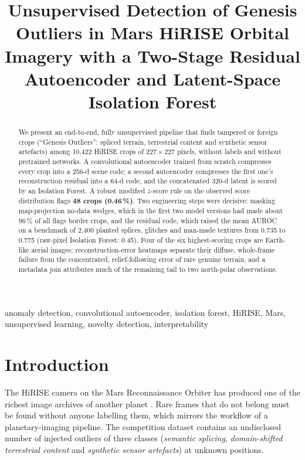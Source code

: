\documentclass[conference]{IEEEtran}
\begin{document}
\title{Unsupervised Detection of Genesis Outliers in Mars HiRISE Orbital Imagery with a Two-Stage
Residual Autoencoder and Latent-Space Isolation Forest}

\author{
}

\maketitle

\begin{abstract}
We present an end-to-end, fully unsupervised pipeline that finds tampered or foreign crops (``Genesis
Outliers'': spliced terrain, terrestrial content and synthetic sensor artefacts) among 10{,}422
HiRISE crops of $227\times227$ pixels, without labels and without pretrained networks. A convolutional
autoencoder trained from scratch compresses every crop into a 256-d scene code; a second autoencoder
compresses the first one's reconstruction residual into a 64-d code, and the concatenated 320-d latent
is scored by an Isolation Forest. A robust modified $z$-score rule on the observed score distribution
flags \textbf{48 crops (0.46\,\%)}. Two engineering steps were decisive:
masking map-projection no-data wedges, which in the first two model versions had made about 96\,\% of
all flags border crops, and the residual code, which raised the mean AUROC on a benchmark of 2{,}400
planted splices, glitches and man-made textures from 0.735 to 0.775 (raw-pixel Isolation Forest:
0.45). Four of the six highest-scoring crops are Earth-like aerial images; reconstruction-error
heatmaps separate their diffuse, whole-frame failure from the concentrated, relief-following error of
rare genuine terrain, and a metadata join attributes much of the remaining tail to two north-polar
observations.
\end{abstract}

\begin{IEEEkeywords}
anomaly detection, convolutional autoencoder, isolation forest, HiRISE, Mars, unsupervised learning,
novelty detection, interpretability
\end{IEEEkeywords}

\section{Introduction}
The HiRISE camera on the Mars Reconnaissance Orbiter has produced one of the richest image archives of
another planet \cite{mcewen2007}. Rare frames that do not belong must be found without anyone labelling
them, which mirrors the workflow of a planetary-imaging pipeline. The competition dataset \cite{doran2020}
contains an undisclosed number of injected outliers of three classes (\emph{semantic splicing},
\emph{domain-shifted terrestrial content} and \emph{synthetic sensor artefacts}) at unknown positions.
\end{document}
